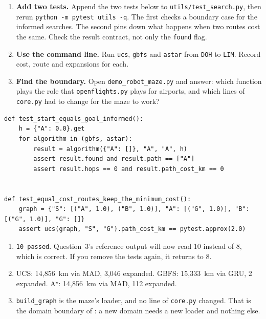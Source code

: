 \begin{yourturn}
\begin{enumerate}
  \item \textbf{Add two tests.} Append the two tests below to \texttt{utils/test\_search.py}, then rerun \texttt{python -m pytest utils -q}. The first checks a boundary case for the informed searches. The second pins down what happens when two routes cost the same. Check the result contract, not only the \texttt{found} flag.
  \item \textbf{Use the command line.} Run \texttt{ucs}, \texttt{gbfs} and \texttt{astar} from \texttt{DOH} to \texttt{LIM}. Record cost, route and expansions for each.
  \item \textbf{Find the boundary.} Open \texttt{demo\_robot\_maze.py} and answer: which function plays the role that \texttt{openflights.py} plays for airports, and which lines of \texttt{core.py} had to change for the maze to work?
\end{enumerate}
\begin{lstlisting}[style=utppython]
def test_start_equals_goal_informed():
    h = {"A": 0.0}.get
    for algorithm in (gbfs, astar):
        result = algorithm({"A": []}, "A", "A", h)
        assert result.found and result.path == ["A"]
        assert result.hops == 0 and result.path_cost_km == 0


def test_equal_cost_routes_keep_the_minimum_cost():
    graph = {"S": [("A", 1.0), ("B", 1.0)], "A": [("G", 1.0)], "B": [("G", 1.0)], "G": []}
    assert ucs(graph, "S", "G").path_cost_km == pytest.approx(2.0)
\end{lstlisting}
\end{yourturn}

\begin{expectedfindings}
\begin{enumerate}
  \item \texttt{10 passed}. Question~3's reference output will now read 10 instead of 8, which is correct. If you remove the tests again, it returns to 8.
  \item UCS: 14,856~km via MAD, 3,046 expanded. GBFS: 15,333~km via GRU, 2 expanded. A$^\star$: 14,856~km via MAD, 112 expanded.
  \item \texttt{build\_graph} is the maze's loader, and no line of \texttt{core.py} changed. That is the domain boundary of : a new domain needs a new loader and nothing else.
\end{enumerate}
\end{expectedfindings}

